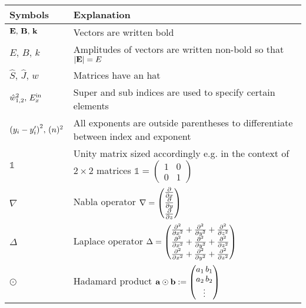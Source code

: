 \begingroup
\renewcommand{\arraystretch}{1.5}
\begin{tabular}{m{4cm} l}
Symbols & Explanation \\
\midrule
$\vb E, \, \vb B, \, \vb k$ & Vectors are written bold \\
$E, \, B, \, k $ &
Amplitudes of vectors are written non-bold so that $\qty|\vb E| = E$ \\
$\hat S, \, \hat J, \, \hat w$ & Matrices have an hat \\
$\hat w^2_{1,2}, \, E^{\mathrm{in}}_x$ & Super and sub indices are used to specify certain elements \\
$\qty(y_i - y_i')^2, \, (n)^2$ & All exponents are outside parentheses to differentiate between index and exponent \\
$\mathds 1$ & Unity matrix sized accordingly e.g. in the context of $2 \times 2$ matrices
$\mathds 1 = 
\begin{pmatrix}
    1 & 0\\
    0 & 1
\end{pmatrix}$\\
$\nabla$ & Nabla operator
$\nabla
= \begin{pmatrix}
    \pdv x \\
    \pdv y \\
    \pdv z
\end{pmatrix}$ \\
$\Delta$ & Laplace operator $\Delta =
\begin{pmatrix}
    \pdv[2] x + \pdv[2] y + \pdv[2] z \\
    \pdv[2] x + \pdv[2] y + \pdv[2] z \\
    \pdv[2] x + \pdv[2] y + \pdv[2] z 
\end{pmatrix}$\\
$\odot$ & Hadamard product
    $\vb a \odot \vb b :=
    \begin{pmatrix}
        a_1 \, b_1 \\
        a_2 \, b_2 \\
        \vdots
    \end{pmatrix}$\\
\end{tabular}
\endgroup
